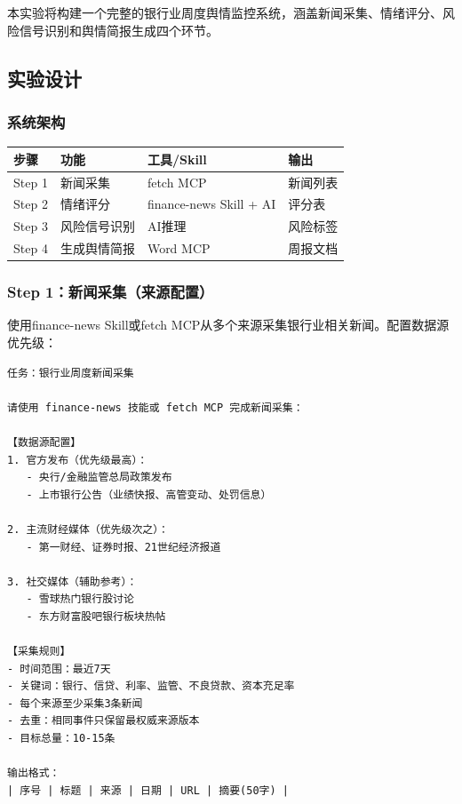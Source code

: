 本实验将构建一个完整的银行业周度舆情监控系统，涵盖新闻采集、情绪评分、风险信号识别和舆情简报生成四个环节。

\subsection{实验设计}

\subsubsection{系统架构}

\begin{table}[H]
\centering
\begin{tabular}{llll}
\toprule
\textbf{步骤} & \textbf{功能} & \textbf{工具/Skill} & \textbf{输出} \\
\midrule
Step 1 & 新闻采集 & fetch MCP & 新闻列表 \\
Step 2 & 情绪评分 & finance-news Skill + AI & 评分表 \\
Step 3 & 风险信号识别 & AI推理 & 风险标签 \\
Step 4 & 生成舆情简报 & Word MCP & 周报文档 \\
\bottomrule
\end{tabular}
\end{table}

\subsubsection{Step 1：新闻采集（来源配置）}

使用finance-news Skill或fetch MCP从多个来源采集银行业相关新闻。配置数据源优先级：

\begin{lstlisting}
任务：银行业周度新闻采集

请使用 finance-news 技能或 fetch MCP 完成新闻采集：

【数据源配置】
1. 官方发布（优先级最高）：
   - 央行/金融监管总局政策发布
   - 上市银行公告（业绩快报、高管变动、处罚信息）

2. 主流财经媒体（优先级次之）：
   - 第一财经、证券时报、21世纪经济报道

3. 社交媒体（辅助参考）：
   - 雪球热门银行股讨论
   - 东方财富股吧银行板块热帖

【采集规则】
- 时间范围：最近7天
- 关键词：银行、信贷、利率、监管、不良贷款、资本充足率
- 每个来源至少采集3条新闻
- 去重：相同事件只保留最权威来源版本
- 目标总量：10-15条

输出格式：
| 序号 | 标题 | 来源 | 日期 | URL | 摘要(50字) |
\end{lstlisting}

